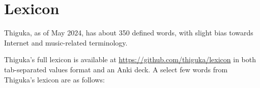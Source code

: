 
\newpage
\section{Lexicon}
Thiguka, as of May 2024, has about 350 defined words, with slight bias towards Internet and music-related terminology.

Thiguka's full lexicon is available at \url{https://github.com/thiguka/lexicon} in both tab-separated values format and an Anki deck.
A select few words from Thiguka's lexicon are as follows:






